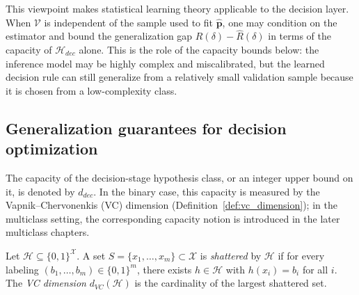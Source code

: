 This viewpoint makes statistical learning theory applicable to the decision layer. When $\mathcal{V}$ is independent of the sample used to fit $\hat{\mathbf{p}}$, one may condition on the estimator and bound the generalization gap $R(\delta)-\hat{R}(\delta)$ in terms of the capacity of $\mathcal{H}_{dec}$ alone. This is the role of the capacity bounds below: the inference model may be highly complex and miscalibrated, but the learned decision rule can still generalize from a relatively small validation sample because it is chosen from a low-complexity class.

\subsection{Generalization guarantees for decision optimization}

The capacity of the decision-stage hypothesis class, or an integer upper bound on it, is denoted by $d_{dec}$. In the binary case, this capacity is measured by the Vapnik--Chervonenkis (VC) dimension (Definition~\ref{def:vc_dimension}); in the multiclass setting, the corresponding capacity notion is introduced in the later multiclass chapters.

\begin{definition}[VC dimension]\label{def:vc_dimension}
    Let $\mathcal{H} \subseteq \{0,1\}^{\mathcal{X}}$.
    A set $S = \{x_1, \ldots, x_m\} \subset \mathcal{X}$ is \emph{shattered} by $\mathcal{H}$
    if for every labeling $(b_1, \ldots, b_m) \in \{0,1\}^m$, there exists $h \in \mathcal{H}$
    with $h(x_i) = b_i$ for all $i$.
    The \emph{VC dimension} $d_{VC}(\mathcal{H})$ is the cardinality of the largest
    shattered set.
\end{definition}

